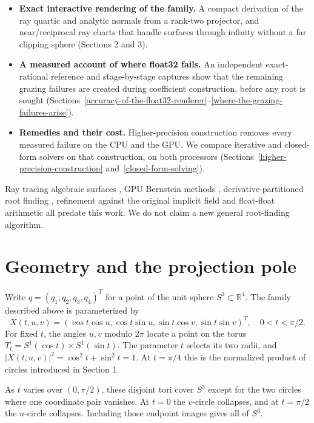 \documentclass{jcgt}
\providecommand{\tightlist}{\setlength{\itemsep}{0pt}\setlength{\parskip}{0pt}}
\begin{document}
\begin{itemize}
\tightlist
\item
  \textbf{Exact interactive rendering of the family.} A compact
  derivation of the ray quartic and analytic normals from a rank-two
  projector, and near/reciprocal ray charts that handle surfaces through
  infinity without a far clipping sphere (Sections 2 and 3).
\item
  \textbf{A measured account of where float32 fails.} An independent
  exact-rational reference and stage-by-stage captures show that the
  remaining grazing failures are created during coefficient
  construction, before any root is sought (Sections~\ref{accuracy-of-the-float32-renderer}--\ref{where-the-grazing-failures-arise}).
\item
  \textbf{Remedies and their cost.} Higher-precision construction
  removes every measured failure on the CPU and the GPU. We compare
  iterative and closed-form solvers on that construction, on both
  processors (Sections~\ref{higher-precision-construction} and~\ref{closed-form-solving}).
\end{itemize}

Ray tracing algebraic surfaces \citep{hanrahan1983}, GPU Bernstein
methods \citep{seland2007}, derivative-partitioned root finding
\citep{yuksel2022, peters2023}, refinement against the original implicit
field \citep{szente2026} and float-float arithmetic \citep{dekker1971}
all predate this work. We do not claim a new general root-finding
algorithm.

\section{Geometry and the projection
pole}\label{geometry-and-the-projection-pole}

Write \(q=(q_1,q_2,q_3,q_4)^T\) for a point of the unit sphere
\(S^3\subset\mathbb R^4\). The family described above is parameterized
by \[
X(t,u,v)=(\cos t\cos u,\cos t\sin u,\sin t\cos v,\sin t\sin v)^T,
\quad 0<t<\pi/2.
\] For fixed \(t\), the angles \(u,v\) modulo \(2\pi\) locate a point on
the torus \(T_t=S^1(\cos t)\times S^1(\sin t)\). The parameter \(t\)
selects its two radii, and \(|X(t,u,v)|^2=\cos^2t+\sin^2t=1\). At
\(t=\pi/4\) this is the normalized product of circles introduced in
Section 1.

As \(t\) varies over \((0,\pi/2)\), these disjoint tori cover \(S^3\)
except for the two circles where one coordinate pair vanishes. At
\(t=0\) the \(v\)-circle collapses, and at \(t=\pi/2\) the \(u\)-circle
collapses. Including those endpoint images gives all of \(S^3\).
\end{document}
